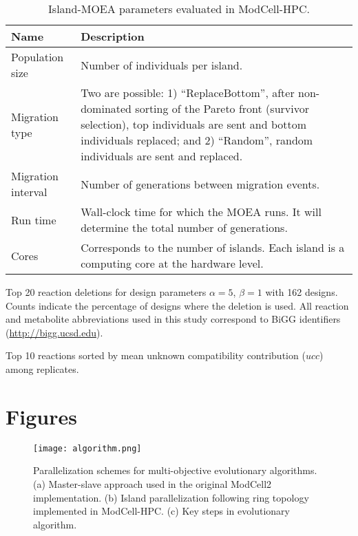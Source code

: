 \documentclass[12pt]{article}
\begin{document}
{\begin{table}[H]
    \caption{Island-MOEA parameters evaluated in ModCell-HPC.}
    \centering
    \begin{tabular}{lp{13cm}}
        \toprule
        Name                & Description   \\
        \midrule
        Population size     & Number of individuals per island.  \\
        Migration type      & Two are possible: 1) ``ReplaceBottom'', after non-dominated sorting of the Pareto front\citep{deb2002} (survivor selection), top individuals are sent and bottom individuals replaced; and 2) ``Random'', random individuals are sent and replaced.  \\
        Migration interval  & Number of generations between migration events.    \\
        Run time            & Wall-clock time for which the MOEA runs. It will determine the total number of generations.   \\
        Cores               & Corresponds to the number of islands. Each island is a computing core at the hardware level. \\
        \hline
    \end{tabular}
    \label{tab7:parameters}
\end{table}

\begin{table}[H]
    \caption{Top 20 reaction deletions for design parameters $\alpha=5$, $\beta=1$ with 162 designs. Counts indicate the percentage of designs where the deletion is used. All reaction and metabolite abbreviations used in this study correspond to BiGG identifiers (\protect\url{http://bigg.ucsd.edu}).}
    \centering
    
    \label{tab7:top20deletions}
\end{table}

\begin{table}[H]
    \caption{Top 10 reactions sorted by mean unknown compatibility contribution ($ucc$) among replicates. }
    \centering
    
    \label{tab7:top10contrib}
\end{table}


\section*{Figures}

\begin{figure}[H]
    \caption{Parallelization schemes for multi-objective evolutionary algorithms. (a) Master-slave approach used in the original ModCell2 implementation. (b) Island parallelization following ring topology implemented in ModCell-HPC. (c) Key steps in evolutionary algorithm.}
    \centering
    \texttt{[image: algorithm.png]}
    \label{fig7:algorithm}
\end{figure}

}
\end{document}
